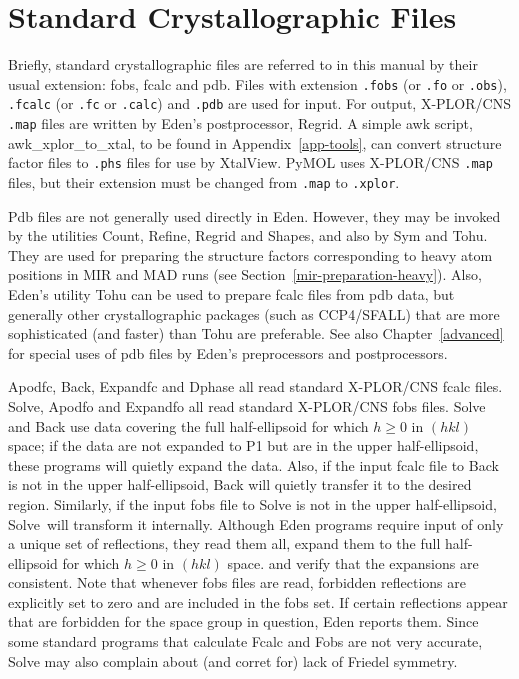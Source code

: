 \documentclass{report}
\begin{document}
\section {Standard Crystallographic Files} 
\label{files-standard}

Briefly, standard crystallographic files
are referred to in this manual by their usual extension: 
fobs, fcalc and pdb.
Files with extension {\tt .fobs} (or {\tt .fo} or {\tt .obs}), 
{\tt .fcalc} (or {\tt .fc} or {\tt .calc}) and 
{\tt .pdb} are used for input.   For output, 
X-PLOR/CNS {\tt .map} files
are written by Eden's postprocessor, Regrid.  
A simple awk script, awk\_xplor\_to\_xtal,
to be found in Appendix~\ref{app-tools}, can convert structure factor files 
to {\tt .phs} files for use by XtalView.
PyMOL  uses X-PLOR/CNS {\tt .map}
files, but their extension must be changed from {\tt .map} to {\tt .xplor}.

\vspace {0.1in}

Pdb files are not generally used directly in Eden.  However, they may 
be invoked by the utilities Count, Refine,
Regrid and Shapes,
and also by
Sym and Tohu.  They are used 
for preparing the structure factors corresponding to heavy atom positions 
in MIR and MAD runs 
(see Section~\ref{mir-preparation-heavy}).  
Also, Eden's utility Tohu can be used to prepare fcalc files from 
pdb data,
but generally other crystallographic packages (such as CCP4/SFALL) that are more
sophisticated (and faster) than Tohu are preferable.
See also Chapter~\ref{advanced} for special uses of pdb files
by Eden's preprocessors and postprocessors.

\vspace {0.1in}

Apodfc, Back, Expandfc and 
Dphase all read standard 
X-PLOR/CNS fcalc files. 
Solve, Apodfo and Expandfo 
all read standard X-PLOR/CNS fobs files.  
Solve and Back use data covering 
the full half-ellipsoid 
for which $h \geq 0$ in $(h k l)$ space; if the data are not expanded to P1
but are in the upper half-ellipsoid, these programs will quietly expand the
data.  Also, if the input fcalc file to Back is not in the upper 
half-ellipsoid, Back will quietly 
transfer it to the desired region.  
Similarly, if the input fobs file to Solve is not in the upper half-ellipsoid, 
Solve\ will transform it internally.
Although Eden programs require input of
only a unique set of reflections, they read them all,
expand them to the full half-ellipsoid for which $h \geq 0$ in $(h k l)$ space.
and verify that the expansions are consistent.  
Note that whenever fobs files are read,
forbidden reflections are explicitly set to zero 
and are included in the fobs set.
If certain reflections appear that are forbidden for the 
space group in question, Eden reports them. Since some standard programs 
that calculate Fcalc and Fobs are not very accurate, Solve may also
complain about (and corret for) lack of Friedel symmetry.
\end{document}
